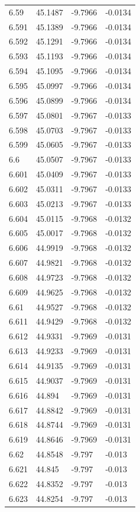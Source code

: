 \begin{tabular}{llll}
6.59 & 45.1487 & -9.7966 & -0.0134 \\
6.591 & 45.1389 & -9.7966 & -0.0134 \\
6.592 & 45.1291 & -9.7966 & -0.0134 \\
6.593 & 45.1193 & -9.7966 & -0.0134 \\
6.594 & 45.1095 & -9.7966 & -0.0134 \\
6.595 & 45.0997 & -9.7966 & -0.0134 \\
6.596 & 45.0899 & -9.7966 & -0.0134 \\
6.597 & 45.0801 & -9.7967 & -0.0133 \\
6.598 & 45.0703 & -9.7967 & -0.0133 \\
6.599 & 45.0605 & -9.7967 & -0.0133 \\
6.6 & 45.0507 & -9.7967 & -0.0133 \\
6.601 & 45.0409 & -9.7967 & -0.0133 \\
6.602 & 45.0311 & -9.7967 & -0.0133 \\
6.603 & 45.0213 & -9.7967 & -0.0133 \\
6.604 & 45.0115 & -9.7968 & -0.0132 \\
6.605 & 45.0017 & -9.7968 & -0.0132 \\
6.606 & 44.9919 & -9.7968 & -0.0132 \\
6.607 & 44.9821 & -9.7968 & -0.0132 \\
6.608 & 44.9723 & -9.7968 & -0.0132 \\
6.609 & 44.9625 & -9.7968 & -0.0132 \\
6.61 & 44.9527 & -9.7968 & -0.0132 \\
6.611 & 44.9429 & -9.7968 & -0.0132 \\
6.612 & 44.9331 & -9.7969 & -0.0131 \\
6.613 & 44.9233 & -9.7969 & -0.0131 \\
6.614 & 44.9135 & -9.7969 & -0.0131 \\
6.615 & 44.9037 & -9.7969 & -0.0131 \\
6.616 & 44.894 & -9.7969 & -0.0131 \\
6.617 & 44.8842 & -9.7969 & -0.0131 \\
6.618 & 44.8744 & -9.7969 & -0.0131 \\
6.619 & 44.8646 & -9.7969 & -0.0131 \\
6.62 & 44.8548 & -9.797 & -0.013 \\
6.621 & 44.845 & -9.797 & -0.013 \\
6.622 & 44.8352 & -9.797 & -0.013 \\
6.623 & 44.8254 & -9.797 & -0.013 \\

\end{tabular}
